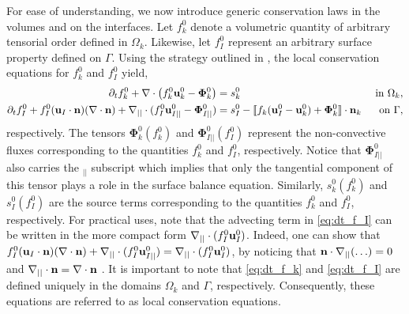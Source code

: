 For ease of understanding, we now introduce generic conservation laws in the volumes and on the interfaces. 
Let $f_k^0$ denote a volumetric quantity of arbitrary tensorial order defined in $\Omega_k$.
Likewise, let $f_I^0$ represent an arbitrary surface property defined on $\Gamma$.
Using the strategy outlined in \citep{ishii2010thermo,bothe2022sharp}, the local conservation equations for $f_k^0$ and $f_I^0$ yield,  
\begin{align}
    \label{eq:dt_f_k}
    \partial_t f_k^0
    +\mathbf{\nabla}\cdot \left(
        f_k^0\textbf{u}_k^0
        - \mathbf{\Phi}_k^0
        \right)
    &= 
    s_k^0
    & \text{ in } \Omega_k,&\\
    \partial_t f_I^0 
    + f_I^0 (\textbf{u}_I \cdot \textbf{n})(\mathbf{\nabla}\cdot \textbf{n})
    +\mathbf{\nabla}_{||}\cdot
    (f_I^0 \textbf{u}_{I||}^0
        - \mathbf{\Phi}_{I||}^0 )
    &= 
    s_I^0
    - \llbracket 
       f_k (\textbf{u}_I^0 - \textbf{u}_k^0)
       + \mathbf{\Phi}_k^0
     \rrbracket \cdot \textbf{n}_k 
    & \text{ on } \Gamma,&
    \label{eq:dt_f_I}
\end{align}
respectively.
The tensors $\mathbf{\Phi}_k^0(f_k^0)$ and $\mathbf{\Phi}_{I||}^0(f_I^0)$ represent the non-convective fluxes corresponding to the quantities $f_k^0$ and $f_I^0$, respectively. 
Notice that $\mathbf{\Phi}_{I||}^0$ also carries the $_{||}$ subscript which implies that only the tangential component of this tensor plays a role in the surface balance equation. 
Similarly, $s_k^0(f_k^0)$ and $s_I^0(f_I^0)$ are the source terms corresponding to the quantities $f_k^0$ and $f_I^0$, respectively.
For practical uses, note that the advecting term in \ref{eq:dt_f_I} can be written in the more compact form $\mathbf{\nabla}_{||}\cdot(f_I^0 \textbf{u}_I^0)$. 
Indeed, one can show that $f_I^0 (\textbf{u}_I \cdot \textbf{n})(\mathbf{\nabla}\cdot \textbf{n})
+\mathbf{\nabla}_{||}\cdot(f_I^0 \textbf{u}_{I||}^0) = \mathbf{\nabla}_{||}\cdot(f_I^0 \textbf{u}_I^0)$, by noticing that $\textbf{n}\cdot\mathbf{\nabla}_{||}(\ldots) = 0$ and $\mathbf{\nabla}_{||}\cdot\textbf{n} = \mathbf{\nabla}\cdot\textbf{n}$ \citep{nadim1996concise}.
It is important to note that \ref{eq:dt_f_k} and \ref{eq:dt_f_I} are defined uniquely in the domains $\Omega_k$ and $\Gamma$, respectively.
Consequently, these equations are referred to as local conservation equations. 


